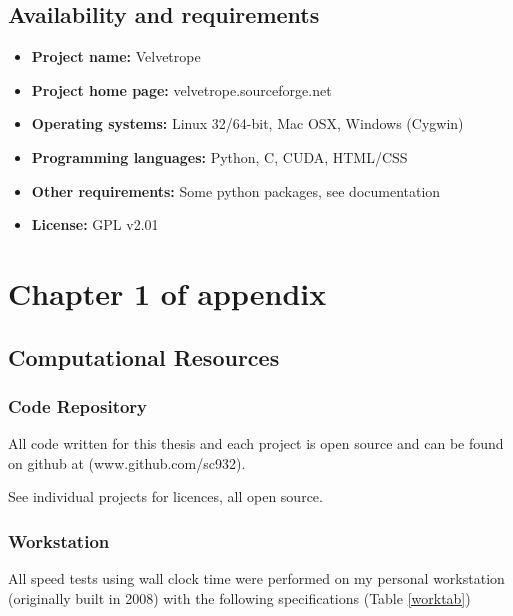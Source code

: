 \documentclass[phd,tocprelim]{cornell}
\begin{document}
\section{Availability and requirements}
 \begin{itemize}
  \item \textbf{Project name:} Velvetrope
  \item \textbf{Project home page:} velvetrope.sourceforge.net
  \item \textbf{Operating systems:} Linux 32/64-bit, Mac OSX, Windows (Cygwin)
  \item \textbf{Programming languages:} Python, C, CUDA, HTML/CSS
  \item \textbf{Other requirements:} Some python packages, see documentation
  \item \textbf{License:} GPL v2.01
 \end{itemize}



\appendix
\chapter{Chapter 1 of appendix}

\section{Computational Resources}

\subsection{Code Repository}

All code written for this thesis and each project is open source and can be found on github at (www.github.com/sc932).

See individual projects for licences, all open source.

\subsection{Workstation}

All speed tests using wall clock time were performed on my personal workstation (originally built in 2008) with the following specifications (Table \ref{worktab})
\end{document}
